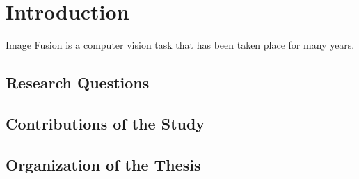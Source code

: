 \chapter{Introduction}
\label{chp:intro}

Image Fusion is a computer vision task that has been taken place for many years.


\section{Research Questions}


\section{Contributions of the Study}    


\section{Organization of the Thesis}